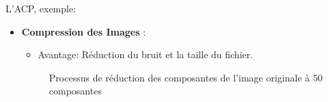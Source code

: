 \documentclass{beamer}
\begin{document}
\begin{frame}{L'ACP, exemple:}
    \begin{itemize}
        \item \textbf{Compression des Images} : 
        \begin{itemize}
            \item Avantage: Réduction du bruit et la taille du fichier.
        \end{itemize}

        \vspace{0.2cm}
        \begin{figure}[ht]
            \centering
            \caption{Processus de réduction des composantes de l'image originale à 50 composantes}
            \label{fig:preprocessing_flow}
        \end{figure}
    \end{itemize}
\end{frame}
\end{document}
